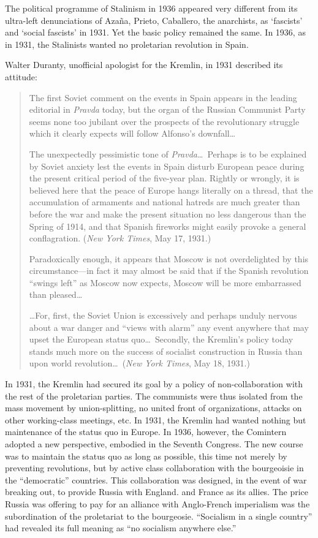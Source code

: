 The political programme of Stalinism in 1936 appeared very different from its ultra-left denunciations of Azaña, Prieto, Caballero, the anarchists, as ‘fascists’ and ‘social fascists’ in 1931. Yet the basic policy remained the same. In 1936, as in 1931, the Stalinists wanted no proletarian revolution in Spain.

Walter Duranty, unofficial apologist for the Kremlin, in 1931 described its attitude:
\begin{quote}
  The first Soviet comment on the events in Spain appears in the leading editorial in \emph{Pravda} today, but the organ of the Russian Communist Party seems none too jubilant over the prospects of the revolutionary struggle which it clearly expects will follow Alfonso’s downfall\ldots
  
  The unexpectedly pessimistic tone of \emph{Pravda}\ldots\ Perhaps is to be explained by Soviet anxiety lest the events in Spain disturb European peace during the present critical period of the five-year plan. Rightly or wrongly, it is believed here that the peace of Europe hangs literally on a thread, that the accumulation of armaments and national hatreds are much greater than before the war and make the present situation no less dangerous than the Spring of 1914, and that Spanish fireworks might easily provoke a general conflagration. (\emph{New York Times}, May 17, 1931.)
  
  Paradoxically enough, it appears that Moscow is not overdelighted by this circumstance---in fact it may almost be said that if the Spanish revolution ``swings left'' as Moscow now expects, Moscow will be more embarrassed than pleased\ldots
  
  \ldots For, first, the Soviet Union is excessively and perhaps unduly nervous about a war danger and ``views with alarm'' any event anywhere that may upset the European status quo\ldots\ Secondly, the Kremlin’s policy today stands much more on the success of socialist construction in Russia than upon world revolution\ldots\ (\emph{New York Times}, May 18, 1931.)
\end{quote}
In 1931, the Kremlin had secured its goal by a policy of non-col\-lab\-or\-ation with the rest of the proletarian parties. The communists were thus isolated from the mass movement by union-splitting, no united front of organizations, attacks on other working-class meetings, etc. In 1931, the Kremlin had wanted nothing but maintenance of the status quo in Europe. In 1936, however, the Comintern adopted a new perspective, embodied in the Seventh Congress. The new course was to maintain the status quo as long as possible, this time not merely by preventing revolutions, but by active class collaboration with the bourgeoisie in the ``democratic'' countries. This collaboration was designed, in the event of war breaking out, to provide Russia with England. and France as its allies. The price Russia was offering to pay for an alliance with Anglo-French imperialism was the subordination of the proletariat to the bourgeosie. ``Socialism in a single country'' had revealed its full meaning as ``no socialism anywhere else.''

